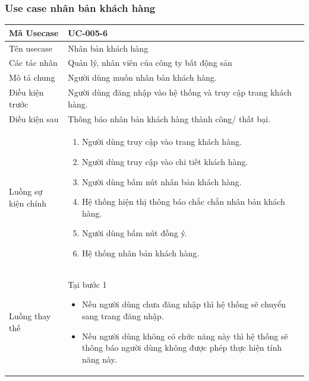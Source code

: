 \documentclass[12pt,a4paper]{article}
\begin{document}
    \subsubsection*{Use case nhân bản khách hàng }
    \begin{table}[H]
        \centering
        \begin{tabular}{|p{3.5cm}|p{11.5cm}|c|}
            \hline
            Mã Usecase      & UC-005-6                                                        \\
            \hline
            Tên usecase     & Nhân bản khách hàng                                             \\
            \hline
            Các tác nhân    & Quản lý, nhân viên của công ty bất động sản                     \\
            \hline
            Mô tả chung     & Người dùng muốn nhân bản khách hàng.                            \\
            \hline

            Điều kiện trước & Người dùng đăng nhập vào hệ thống và truy cập trang khách hàng. \\
            \hline

            Điều kiện sau   & Thông báo nhân bản khách hàng thành công/ thất bại.             \\
            \hline

            Luồng sự kiện chính & \vspace{-.8cm}\begin{enumerate}
                                                    \item Người dùng truy cập vào trang khách hàng.
                                                    \item Người dùng truy cập vào chi tiết khách hàng.
                                                    \item  Người dùng bấm nút nhân bản khách hàng.
                                                    \item  Hệ thống hiện thị thông báo chắc chắn nhân bản khách hàng.
                                                    \item  Người dùng bấm nút đồng ý.
                                                    \item Hệ thống nhân bản khách hàng.
            \end{enumerate}
            \\
            \hline
            Luồng thay thế & Tại bước 1\newline
            \vspace{-.8cm}\begin{itemize}
                              \item Nếu người dùng chưa đăng nhập thì hệ thống sẽ chuyển sang trang đăng nhập.
                              \item Nếu người dùng không có chức năng này thì hệ thống sẽ thông báo người dùng không được phép thực hiện tính năng này.
            \end{itemize}


\end{tabular}
\end{table}
\end{document}
